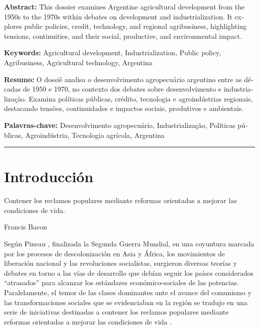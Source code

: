 \begin{tcolorbox}[colback=brown!8!white,colframe=brown!8!white,boxrule=0pt,arc=2pt,left=4pt,right=4pt,top=3pt,bottom=3pt,before skip=4pt,after skip=4pt]
\begin{otherlanguage}{english}
\sffamily\small \textbf{Abstract:} This dossier examines Argentine agricultural development from the 1950s to the 1970s within debates on development and industrialization. It explores public policies, credit, technology, and regional agribusiness, highlighting tensions, continuities, and their social, productive, and environmental impact.
\par\smallskip\noindent\textbf{Keywords:} Agricultural development, Industrialization, Public policy, Agribusiness, Agricultural technology, Argentina
\end{otherlanguage}
\end{tcolorbox}

\begin{tcolorbox}[colback=brown!8!white,colframe=brown!8!white,boxrule=0pt,arc=2pt,left=4pt,right=4pt,top=3pt,bottom=3pt,before skip=4pt,after skip=4pt]
\begin{otherlanguage}{portuguese}
\sffamily\small \textbf{Resumo:} O dossiê analisa o desenvolvimento agropecuário argentino entre as décadas de 1950 e 1970, no contexto dos debates sobre desenvolvimento e industrialização. Examina políticas públicas, crédito, tecnologia e agroindústrias regionais, destacando tensões, continuidades e impactos sociais, produtivos e ambientais.
\par\smallskip\noindent\textbf{Palavras-chave:} Desenvolvimento agropecuário, Industrialização, Políticas públicas, Agroindústria, Tecnologia agrícola, Argentina
\end{otherlanguage}
\end{tcolorbox}

\bigskip
\noindent\rule{\linewidth}{0.4pt}
\bigskip

\section{Introducción}

\epigraph{Contener los reclamos populares mediante reformas orientadas a mejorar las condiciones de vida.

}{Francis Bacon}

Según Pineau \autocite*{3040-PINEAU2018}, finalizada la Segunda Guerra Mundial, en una coyuntura marcada por los procesos de descolonización en Asia y África, los movimientos de liberación nacional y las revoluciones socialistas, surgieron diversas teorías y debates en torno a las vías de desarrollo que debían seguir los países considerados “atrasados” para alcanzar los estándares económico-sociales de las potencias. Paralelamente, el temor de las clases dominantes ante el avance del comunismo y las transformaciones sociales que se evidenciaban en la región se tradujo en una serie de iniciativas destinadas a contener los reclamos populares mediante reformas orientadas a mejorar las condiciones de vida \autocite{3040-PINEAU2018}.


